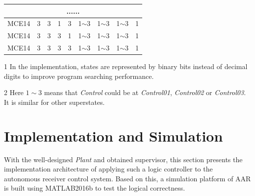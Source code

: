 \begin{table}[!htbp]
\begin{threeparttable}
\begin{tabular}{|c|c|c|>{\hfil}p{30pt}<{\hfil}|>{\hfil}p{30pt}<{\hfil}|>{\hfil}p{30pt}<{\hfil}|>{\hfil}p{30pt}<{\hfil}|>{\hfil}p{30pt}<{\hfil}|c|}
			\multicolumn{9}{|c|}{......} \\ \hline
			MCE14 & 3 & 3 & 1 & 3 & 1$\sim$3 & 1$\sim$3 & 1$\sim$3 & 1 \\ \hline
			MCE14 & 3 & 3 & 3 & 1 & 1$\sim$3 & 1$\sim$3 & 1$\sim$3 & 1 \\ \hline
			MCE14 & 3 & 3 & 3 & 3 & 1$\sim$3 & 1$\sim$3 & 1$\sim$3 & 1 \\ \hline
		\end{tabular}
		\begin{tablenotes}\footnotesize
			\item[1] In the implementation, states are represented by binary bits instead of decimal digits to improve program searching performance.
			\item[2] Here $ 1 \sim 3 $ means that \textit{Control} could be at \textit{Control01}, \textit{Control02} or \textit{Control03}. It is similar for other superstates.
		\end{tablenotes}
	\end{threeparttable}
\end{table}

\section{Implementation and Simulation}
With the well-designed \textit{Plant} and obtained supervisor, this section presents the implementation architecture of applying such a logic controller to the autonomous receiver control system. Based on this, a simulation platform of AAR is built using MATLAB2016b to test  the logical correctness.

